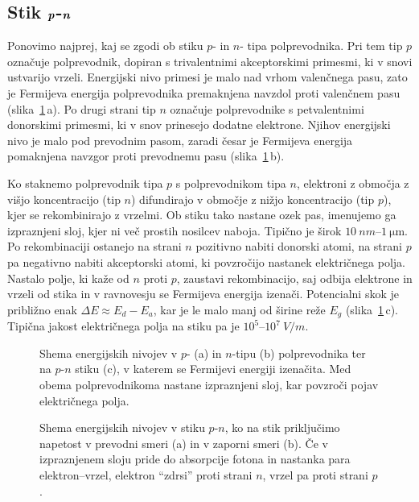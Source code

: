 \subsection*{Stik $\textbf{\textit{p}}$-$\textbf{\textit{n}}$}
Ponovimo najprej, kaj se zgodi ob stiku $p$- in $n$- tipa polprevodnika. Pri tem tip $p$ označuje
polprevodnik, dopiran s trivalentnimi akceptorskimi primesmi, ki v snovi ustvarijo vrzeli.
Energijski nivo primesi je malo nad vrhom valenčnega pasu, zato je Fermijeva energija
polprevodnika premaknjena navzdol proti valenčnem pasu (slika~\ref{11_PN1}\,a). 
Po drugi strani tip $n$ označuje polprevodnike s petvalentnimi 
donorskimi primesmi, ki v snov prinesejo dodatne elektrone. Njihov energijski nivo je malo 
pod prevodnim pasom, zaradi česar je Fermijeva energija pomaknjena navzgor proti prevodnemu pasu
(slika~\ref{11_PN1}\,b).

Ko staknemo polprevodnik tipa $p$ s polprevodnikom tipa $n$, elektroni 
z območja z višjo koncentracijo (tip $n$) difundirajo v območje z nižjo koncentracijo
(tip $p$), kjer se rekombinirajo z vrzelmi. 
Ob stiku tako nastane ozek pas, imenujemo ga izpraznjeni sloj, kjer ni več 
prostih nosilcev naboja. Tipično je širok $10~\si{nm}$--$1~\si{\micro\metre}$.
Po rekombinaciji ostanejo na strani $n$ pozitivno nabiti donorski atomi, 
na strani $p$ pa negativno nabiti akceptorski atomi, ki povzročijo nastanek  
električnega polja. Nastalo polje, ki kaže od $n$ proti $p$, zaustavi rekombinacijo, saj odbija
elektrone in vrzeli od stika in v ravnovesju se Fermijeva energija izenači. Potencialni
skok je približno enak $\Delta E \approx E_d-E_a$, kar je le malo manj od 
širine reže $E_g$ (slika~\ref{11_PN1}\,c). Tipična jakost električnega polja na stiku pa
je $10^5$--$10^7~\si{V/m}$.

\begin{figure}[h]
\centering
\def\svgwidth{140truemm} 

\caption{Shema energijskih nivojev v $p$- (a) in $n$-tipu (b) polprevodnika ter na $p$-$n$ stiku (c), 
v katerem se Fermijevi energiji izenačita. Med obema polprevodnikoma nastane izpraznjeni sloj, kar 
povzroči pojav električnega polja.}
\label{11_PN1}
\end{figure}

\begin{figure}[h]
\centering
\def\svgwidth{140truemm} 

\caption{Shema energijskih nivojev v stiku $p$-$n$, ko na stik priključimo napetost
v prevodni smeri (a) in v zaporni smeri (b). Če v izpraznjenem sloju pride do absorpcije
fotona in nastanka para elektron--vrzel, elektron ``zdrsi'' proti strani $n$, vrzel pa proti
strani $p$.}
\label{11_PNU}
\end{figure}

